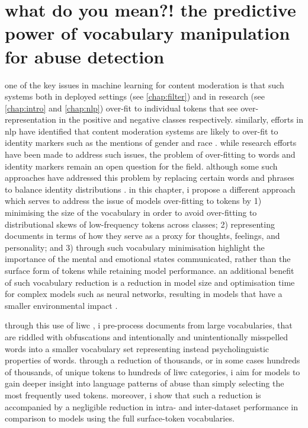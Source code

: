 \ifpdf
    \graphicspath{{chapter5/figs/raster/}{chapter5/figs/pdf/}{chapter5/figs/}}
\else
    \graphicspath{{chapter5/figs/vector/}{chapter5/figs/}}
\fi

\chapter{what do you mean?! the predictive power of vocabulary manipulation for abuse detection}\label{chap:liwc}

one of the key issues in machine learning for content moderation is that such systems both in deployed settings (see \cref{chap:filter}) and in research (see \cref{chap:intro} and \cref{chap:nlp}) over-fit to individual tokens that see over-representation in the positive and negative classes respectively.
similarly, efforts in nlp have identified that content moderation systems are likely to over-fit to identity markers such as the mentions of gender and race \citep{dixon:2018}.
while research efforts have been made to address such issues, the problem of over-fitting to words and identity markers remain an open question for the field.
although some such approaches have addressed this problem by replacing certain words and phrases to balance identity distributions \cite{dixon:2018}.
in this chapter, i propose a different approach which serves to address the issue of models over-fitting to tokens by 1) minimising the size of the vocabulary in order to avoid over-fitting to distributional skews of low-frequency tokens across classes; 2) representing documents in terms of how they serve as a proxy for thoughts, feelings, and personality; and 3) through such vocabulary minimisation highlight the importance of the mental and emotional states communicated, rather than the surface form of tokens while retaining model performance.
an additional benefit of such vocabulary reduction is a reduction in model size and optimisation time for complex models such as neural networks, resulting in models that have a smaller environmental impact \citep{strubell:2019}.

through this use of liwc \cite{pennebaker:2015,pennebaker:2001}, i pre-process documents from large vocabularies, that are riddled with obfuscations and intentionally and unintentionally misspelled words into a smaller vocabulary set representing instead psycholinguistic properties of words.
through a reduction of thousands, or in some cases hundreds of thousands, of unique tokens to hundreds of liwc categories, i aim for models to gain deeper insight into language patterns of abuse than simply selecting the most frequently used tokens.
moreover, i show that such a reduction is accompanied by a negligible reduction in intra- and inter-dataset performance in comparison to models using the full surface-token vocabularies.

